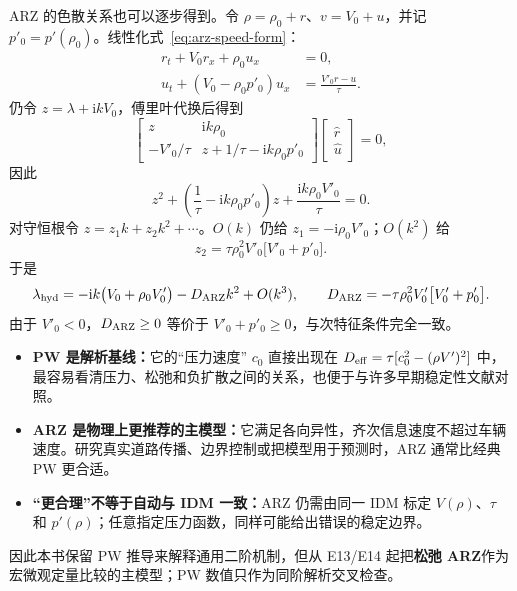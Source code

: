 \documentclass[11pt,a4paper,openany]{book}
\numberwithin{equation}{chapter}
\numberwithin{figure}{chapter}
\numberwithin{table}{chapter}
\begin{document}
ARZ 的色散关系也可以逐步得到。令 $\rho=\rho_0+r$、$v=V_0+u$，并记 $p'_0=p'(\rho_0)$。线性化式~\eqref{eq:arz-speed-form}：
\begin{subequations}
\label{eq:arz-linear-system}
\begin{align}
r_t+V_0r_x+\rho_0u_x&=0,\\
u_t+(V_0-\rho_0p'_0)u_x&=\frac{V'_0r-u}{\tau}.
\end{align}
\end{subequations}
仍令 $z=\lambda+\mathrm{i}kV_0$，傅里叶代换后得到
\begin{equation}
\begin{bmatrix}
z&\mathrm{i}k\rho_0\\[2pt]
-V'_0/\tau&z+1/\tau-\mathrm{i}k\rho_0p'_0
\end{bmatrix}
\begin{bmatrix}\hat r\\ \hat u\end{bmatrix}=0,
\end{equation}
因此
\begin{equation}
z^2+\left(\frac1\tau-\mathrm{i}k\rho_0p'_0\right)z
+\frac{\mathrm{i}k\rho_0V'_0}{\tau}=0.
\label{eq:arz-dispersion}
\end{equation}
对守恒根令 $z=z_1k+z_2k^2+\cdots$。$O(k)$ 仍给 $z_1=-\mathrm{i}\rho_0V'_0$；$O(k^2)$ 给
\begin{equation}
z_2=\tau\rho_0^2V'_0\bigl[V'_0+p'_0\bigr].
\end{equation}
于是
\begin{equation}
\lambda_{\rm hyd}
=-\mathrm{i}k\bigl(V_0+\rho_0V'_0\bigr)
-D_{\rm ARZ}k^2+O(k^3),
\qquad
D_{\rm ARZ}
=-\tau\rho_0^2V'_0\bigl[V'_0+p'_0\bigr].
\label{eq:arz-effective-diffusion}
\end{equation}
由于 $V'_0<0$，$D_{\rm ARZ}\ge0$ 等价于 $V'_0+p'_0\ge0$，与次特征条件完全一致。

\begin{tcolorbox}[notebox,title=\textbf{既然 ARZ 更合理，为什么还要先推 PW？}]
\begin{itemize}[leftmargin=1.4em,itemsep=3pt]
\item \textbf{PW 是解析基线：}它的“压力速度” $c_0$ 直接出现在 $D_{\rm eff}=\tau[c_0^2-(\rho V')^2]$ 中，最容易看清压力、松弛和负扩散之间的关系，也便于与许多早期稳定性文献对照。
\item \textbf{ARZ 是物理上更推荐的主模型：}它满足各向异性，齐次信息速度不超过车辆速度。研究真实道路传播、边界控制或把模型用于预测时，ARZ 通常比经典 PW 更合适。
\item \textbf{“更合理”不等于自动与 IDM 一致：}ARZ 仍需由同一 IDM 标定 $V(\rho)$、$\tau$ 和 $p'(\rho)$；任意指定压力函数，同样可能给出错误的稳定边界。
\end{itemize}
因此本书保留 PW 推导来解释通用二阶机制，但从 E13/E14 起把\textbf{松弛 ARZ}作为宏微观定量比较的主模型；PW 数值只作为同阶解析交叉检查。
\end{tcolorbox}
\end{document}
